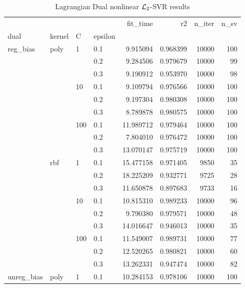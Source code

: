 \begin{table}[H]
\centering
\caption{Lagrangian Dual nonlinear $\protect \mathcal{L}_2$-SVR results}
\label{nonlinear_lagrangian_dual_l2_svr_cv_results}
\begin{tabular}{llllrrrr}
\toprule
           &     &     &     &   fit\_time &        r2 &  n\_iter &  n\_sv \\
dual & kernel & C & epsilon &            &           &         &       \\
\midrule
reg\_bias & poly & 1   & 0.1 &   9.915094 &  0.968399 &   10000 &   100 \\
           &     &     & 0.2 &   9.284506 &  0.979679 &   10000 &    99 \\
           &     &     & 0.3 &   9.190912 &  0.953970 &   10000 &    98 \\
           &     & 10  & 0.1 &   9.109794 &  0.976566 &   10000 &   100 \\
           &     &     & 0.2 &   9.197304 &  0.980308 &   10000 &   100 \\
           &     &     & 0.3 &   8.789878 &  0.980575 &   10000 &   100 \\
           &     & 100 & 0.1 &  11.989712 &  0.979464 &   10000 &   100 \\
           &     &     & 0.2 &   7.804010 &  0.976472 &   10000 &   100 \\
           &     &     & 0.3 &  13.070147 &  0.975719 &   10000 &   100 \\
           & rbf & 1   & 0.1 &  15.477158 &  0.971405 &    9850 &    35 \\
           &     &     & 0.2 &  18.225209 &  0.932771 &    9725 &    28 \\
           &     &     & 0.3 &  11.650878 &  0.897683 &    9733 &    16 \\
           &     & 10  & 0.1 &  10.815310 &  0.989233 &   10000 &    96 \\
           &     &     & 0.2 &   9.790380 &  0.979571 &   10000 &    48 \\
           &     &     & 0.3 &  14.016647 &  0.946013 &   10000 &    35 \\
           &     & 100 & 0.1 &  11.549007 &  0.989731 &   10000 &    77 \\
           &     &     & 0.2 &  12.520265 &  0.980821 &   10000 &    60 \\
           &     &     & 0.3 &  13.262331 &  0.947474 &   10000 &    82 \\
unreg\_bias & poly & 1   & 0.1 &  10.284153 &  0.978106 &   10000 &   100 \\

\end{tabular}
\end{table}
